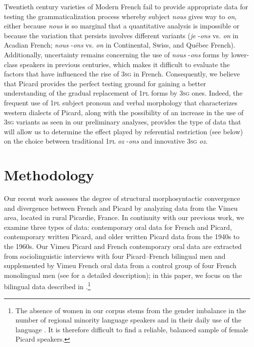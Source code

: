 \documentclass[output=paper,colorlinks,citecolor=brown]{langscibook}
\begin{document}
Twentieth century varieties of Modern French fail to provide appropriate data for testing the grammaticalization process whereby subject \textit{nous} gives way to \textit{on}, either because \textit{nous} is so marginal that a quantitative analysis is impossible or because the variation that persists involves different variants (\textit{je} -\textit{ons} vs. \textit{on} in Acadian French; \textit{nous} -\textit{ons} vs. \textit{on} in Continental, Swiss, and Québec French). Additionally, uncertainty remains concerning the use of \textit{nous} -\textit{ons} forms by lower-class speakers in previous centuries, which makes it difficult to evaluate the factors that have influenced the rise of 3\textsc{sg} in French. Consequently, we believe that Picard provides the perfect testing ground for gaining a better understanding of the gradual replacement of 1\textsc{pl} forms by 3\textsc{sg} ones. Indeed, the frequent use of 1\textsc{pl} subject pronoun and verbal morphology that characterizes western dialects of Picard, along with the possibility of an increase in the use of 3\textsc{sg} variants as seen in our preliminary analyses, provides the type of data that will allow us to determine the effect played by referential restriction (see below) on the choice between traditional 1\textsc{pl} \textit{oz} -\textit{ons} and innovative 3\textsc{sg} \textit{oz}.

\section{Methodology}
Our recent work assesses the degree of structural morphosyntactic convergence and divergence between French and Picard by analyzing data from the Vimeu area, located in rural Picardie, France. In continuity with our previous work, we examine three types of data: contemporary oral data for French and Picard, contemporary written Picard, and older written Picard data from the 1940s to the 1960s. Our Vimeu Picard and French contemporary oral data are extracted from sociolinguistic interviews with four Picard–French bilingual men and supplemented by Vimeu French oral data from a control group of four French monolingual men (see \citealt{villeneuve_chtileu_2013} for a detailed description); in this paper, we focus on the bilingual data described in .\footnote{The absence of women in our corpus stems from the gender imbalance in the number of regional minority language speakers and in their daily use of the language \citep{Pooley2003}. It is therefore difficult to find a reliable, balanced sample of female Picard speakers.}
\end{document}
